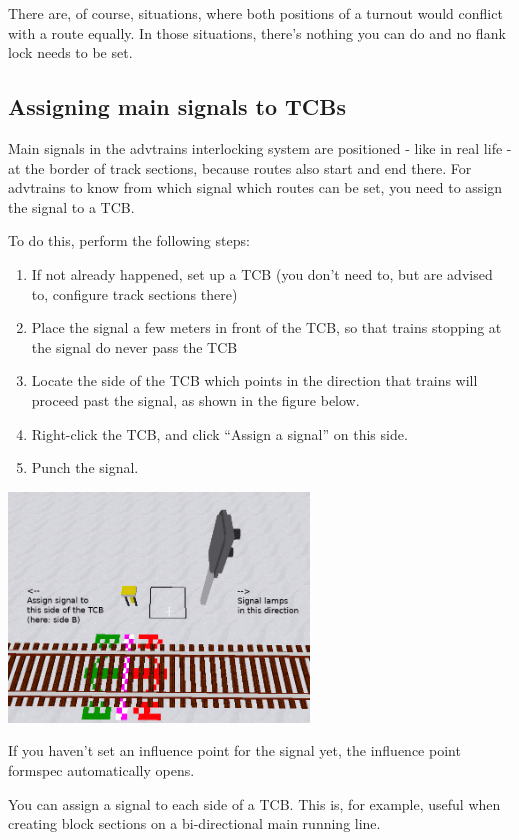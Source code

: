 \documentclass[english]{paper}
\begin{document}
There are, of course, situations, where both positions of a turnout
would conflict with a route equally. In those situations, there's
nothing you can do and no flank lock needs to be set.

\subsection{Assigning main signals to TCBs}

Main signals in the advtrains interlocking system are positioned -
like in real life - at the border of track sections, because routes
also start and end there. For advtrains to know from which signal
which routes can be set, you need to assign the signal to a TCB.

To do this, perform the following steps:
\begin{enumerate}
\item If not already happened, set up a TCB (you don't need to, but are
advised to, configure track sections there)
\item Place the signal a few meters in front of the TCB, so that trains
stopping at the signal do never pass the TCB
\item Locate the side of the TCB which points in the direction that trains
will proceed past the signal, as shown in the figure below.
\item Right-click the TCB, and click ``Assign a signal'' on this side.
\item Punch the signal.
\end{enumerate}
\includegraphics[width=8cm]{8_home_moritz_Home_Projekte_Minetest_minetest_mods_advtrains_assets_lyx_img_assign_signal.png}

If you haven't set an influence point for the signal yet, the influence
point formspec automatically opens.

You can assign a signal to each side of a TCB. This is, for example,
useful when creating block sections on a bi-directional main running
line.
\end{document}
